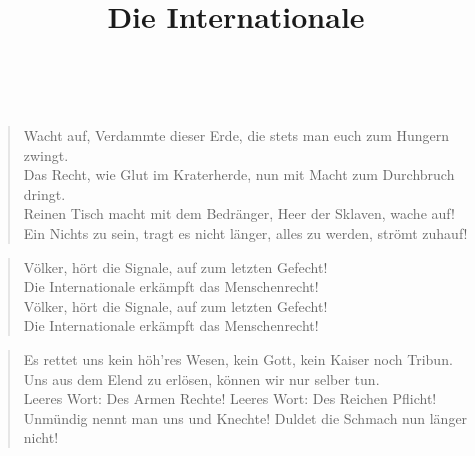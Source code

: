 \documentclass[9pt,a4paper,oneside, onecolumn]{article}
\author{}
\title{Die Internationale}
\date{}
\begin{document}
\maketitle
\thispagestyle{empty}

\mbox{
}\\


\begin{verse}
Wacht auf, Verdammte dieser Erde, die stets man euch zum Hungern zwingt.\\
Das Recht, wie Glut im Kraterherde, nun mit Macht zum Durchbruch dringt.\\
Reinen Tisch macht mit dem Bedränger, Heer der Sklaven, wache auf!\\
Ein Nichts zu sein, tragt es nicht länger, alles zu werden, strömt zuhauf!\\
\end{verse}

\begin{verse}
Völker, hört die Signale, auf zum letzten Gefecht!\\
Die Internationale erkämpft das Menschenrecht!\\
Völker, hört die Signale, auf zum letzten Gefecht!\\
Die Internationale erkämpft das Menschenrecht!\\
\end{verse}

\begin{verse}
Es rettet uns kein höh'res Wesen, kein Gott, kein Kaiser noch Tribun.\\
Uns aus dem Elend zu erlösen, können wir nur selber tun.\\
Leeres Wort: Des Armen Rechte! Leeres Wort: Des Reichen Pflicht!\\
Unmündig nennt man uns und Knechte! Duldet die Schmach nun länger nicht!\\
\end{verse}
\end{document}
